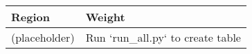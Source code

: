 \begin{tabular}{ll}
\toprule
Region & Weight \\
\midrule
(placeholder) & Run `run_all.py` to create table \\
\bottomrule
\end{tabular}
